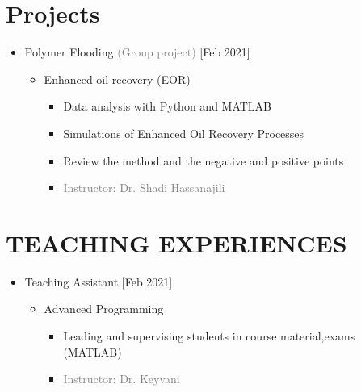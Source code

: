 \documentclass[10pt,a4paper,sans]{moderncv} %
\begin{document}
	
	
	\vspace{  -0.9 em}
	\vspace{-2em}
	\section{Projects}
	\begin{itemize}
		\item  Polymer Flooding    \hfill\textcolor{gray}{(Group project)}   [Feb 2021]
		\begin{itemize}
			\item Enhanced oil recovery (EOR) 
			\begin{itemize} 
		     	\item Data analysis with Python and MATLAB
		     	\item Simulations of Enhanced Oil Recovery Processes
				\item Review the method and the negative and positive points
				
			    
				\item\textcolor{gray}{Instructor: Dr. Shadi Hassanajili}
			\end{itemize}
			
				\newline
			
		\end{itemize}
	\end{itemize}
	\vspace{1em}
	\section{TEACHING EXPERIENCES}
	\begin{itemize}
		\item Teaching Assistant       \hfill[Feb 2021]
		\begin{itemize}

			\item {} Advanced Programming 
			\begin{itemize} 
				\item Leading and supervising students in course material,exams (MATLAB)
				\item\textcolor{gray}{Instructor: Dr. Keyvani}
			\end{itemize}
			
				\newline
			
		\end{itemize}
	\end{itemize}
	
\end{document}
